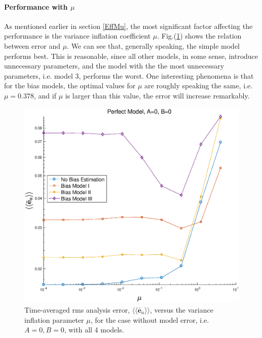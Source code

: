 \documentclass[twocolumn]{article}
\begin{document}
\paragraph{Performance with $\mu$}
As mentioned earlier in section \ref{EffMu}, the most significant factor affecting the performance is the variance inflation coefficient $\mu$. Fig.(\ref{AErrVsMuP1}) shows the relation between error and $\mu$. We can see that, generally speaking, the simple model performs best. This is reasonable, since all other models, in some sense, introduce unnecessary parameters, and the model with the the most unnecessary parameters, i.e. model 3, performs the worst. One interesting phenomena is that for the bias models, the optimal values for $\mu$ are roughly speaking the same, i.e. $\mu=0.378$, and if $\mu$ is larger than this value, the error will increase remarkably.
\begin{figure} 
\centering
\includegraphics[scale=0.3]{Figures/AErrVsMuP1}
\caption{Time-averaged rms analysis error, $\langle\langle\bar{\pmb{e}}_a\rangle\rangle$, versus the variance inflation parameter $\mu$, for the case without model error, i.e. $A=0,B=0$, with all 4 models.}
\label{AErrVsMuP1}
\end{figure}
\end{document}
